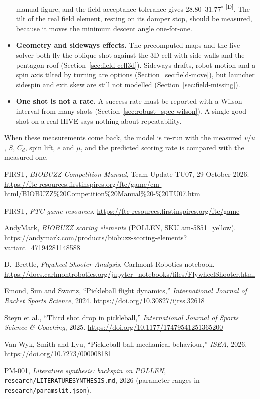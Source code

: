 \documentclass[11pt]{article}
\makeatletter
\DeclareRobustCommand{\provtag}[1]{%
  \ifmmode\text{\provtag@text{#1}}\else\provtag@text{#1}\fi}
\newcommand{\provtag@text}[1]{%
  \textsuperscript{\textsf{\upshape\scriptsize\color@grey[#1]}}}
\newcommand{\color@grey}[1]{#1}
\newcommand{\color@grey}[1]{\pdfliteral{0.45 g}#1\pdfliteral{0 g}}
\DeclareRobustCommand{\derived}{\provtag{D}}
\DeclareRobustCommand{\code}[1]{{\def\_{\textunderscore\allowbreak}\texttt{#1}}}
\makeatother
\begin{document}
\begin{itemize}
    manual figure, and the field acceptance tolerance gives $28.80$--$31.77^\circ$\derived. The tilt of
    the real field element, resting on its damper stop, should be measured, because it moves the
    minimum descent angle one-for-one.
  \item \textbf{Geometry and sideways effects.} The precomputed maps and the live solver both fly the
    oblique shot against the 3D cell with side walls and the pentagon roof
    (Section~\ref{sec:field-cell3d}). Sideways drafts, robot motion and a spin axis tilted by
    turning are options (Section~\ref{sec:field-move}), but launcher sidespin and exit skew are still not
    modelled (Section~\ref{sec:field-missing}).
  \item \textbf{One shot is not a rate.} A success rate must be reported with a Wilson interval from
    many shots (Section~\ref{sec:robust_spec-wilson}). A single good shot on a real HIVE says nothing
    about repeatability.
\end{itemize}

When these measurements come back, the model is re-run with the measured $v/u$, $S$, $C_d$, spin
lift, $e$ and $\mu$, and the predicted scoring rate is compared with the measured one.

\begin{thebibliography}{9}

FIRST, \emph{BIOBUZZ Competition Manual}, Team Update TU07, 29 October 2026.
\url{https://ftc-resources.firstinspires.org/ftc/game/cm-html/BIOBUZZ%20Competition%20Manual%20-%20TU07.htm}

FIRST, \emph{FTC game resources}.
\url{https://ftc-resources.firstinspires.org/ftc/game}

AndyMark, \emph{BIOBUZZ scoring elements} (POLLEN, SKU am-5851\_yellow).
\url{https://andymark.com/products/biobuzz-scoring-elements?variant=47194281148588}

D.~Brettle, \emph{Flywheel Shooter Analysis}, Carlmont Robotics notebook.
\url{https://docs.carlmontrobotics.org/jupyter_notebooks/files/FlywheelShooter.html}

Emond, Sun and Swartz, ``Pickleball flight dynamics,'' \emph{International Journal of Racket
Sports Science}, 2024. \url{https://doi.org/10.30827/ijrss.32618}

Steyn et al., ``Third shot drop in pickleball,'' \emph{International Journal of Sports Science
\& Coaching}, 2025. \url{https://doi.org/10.1177/17479541251365200}

Van Wyk, Smith and Lyu, ``Pickleball ball mechanical behaviour,'' \emph{ISEA}, 2026.
\url{https://doi.org/10.7273/000008181}

PM-001, \emph{Literature synthesis: backspin on POLLEN}, \code{research/LITERATURE\_SYNTHESIS.md},
2026 (parameter ranges in \code{research/params\_lit.json}).

\end{thebibliography}
\end{document}
